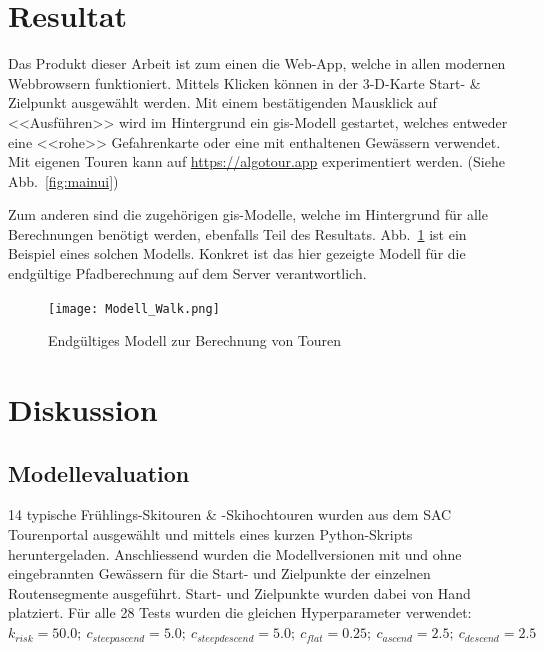 \section{Resultat}

Das Produkt dieser Arbeit ist zum einen die Web-App, welche in allen modernen Webbrowsern funktioniert. Mittels Klicken können in der 3-D-Karte Start- \& Zielpunkt ausgewählt werden. Mit einem bestätigenden Mausklick auf <<Ausführen>> wird im Hintergrund ein \gls{gis}-Modell gestartet, welches entweder eine <<rohe>> Gefahrenkarte oder eine mit enthaltenen Gewässern verwendet. Mit eigenen Touren kann auf \url{https://algotour.app} experimentiert werden. (Siehe Abb.\ \ref{fig:mainui})

Zum anderen sind die zugehörigen \acrshort{gis}-Modelle, welche im Hintergrund für alle Berechnungen benötigt werden, ebenfalls Teil des Resultats. Abb.\ \ref{fig:walkmodel} ist ein Beispiel eines solchen Modells. Konkret ist das hier gezeigte Modell für die endgültige Pfadberechnung auf dem Server verantwortlich.


\begin{figure}[H]
  \centering
  \texttt{[image: Modell\_Walk.png]}
  \caption{Endgültiges Modell zur Berechnung von Touren}\label{fig:walkmodel}
\end{figure}

\clearpage
\section{Diskussion}

\subsection{Modellevaluation}

14 typische Frühlings-Skitouren \& -Skihochtouren wurden aus dem SAC Tourenportal ausgewählt und mittels eines kurzen Python-Skripts heruntergeladen. Anschliessend wurden die Modellversionen mit und ohne eingebrannten Gewässern für die Start- und Zielpunkte der einzelnen Routensegmente ausgeführt. Start- und Zielpunkte wurden dabei von Hand platziert. Für alle 28 Tests wurden die gleichen Hyperparameter verwendet: $k_{risk}={50.0};\ c_{steepascend}={5.0};\ c_{steepdescend}={5.0};\ c_{flat}={0.25};\ c_{ascend}={2.5};\ c_{descend}={2.5}$

